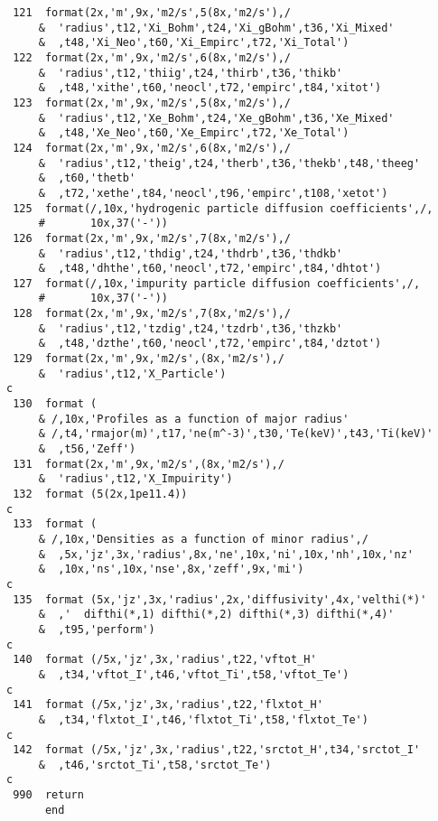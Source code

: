 \begin{verbatim}
 121  format(2x,'m',9x,'m2/s',5(8x,'m2/s'),/
     &  'radius',t12,'Xi_Bohm',t24,'Xi_gBohm',t36,'Xi_Mixed'
     &  ,t48,'Xi_Neo',t60,'Xi_Empirc',t72,'Xi_Total')
 122  format(2x,'m',9x,'m2/s',6(8x,'m2/s'),/
     &  'radius',t12,'thiig',t24,'thirb',t36,'thikb'
     &  ,t48,'xithe',t60,'neocl',t72,'empirc',t84,'xitot')
 123  format(2x,'m',9x,'m2/s',5(8x,'m2/s'),/
     &  'radius',t12,'Xe_Bohm',t24,'Xe_gBohm',t36,'Xe_Mixed'
     &  ,t48,'Xe_Neo',t60,'Xe_Empirc',t72,'Xe_Total')
 124  format(2x,'m',9x,'m2/s',6(8x,'m2/s'),/
     &  'radius',t12,'theig',t24,'therb',t36,'thekb',t48,'theeg'
     &  ,t60,'thetb'
     &  ,t72,'xethe',t84,'neocl',t96,'empirc',t108,'xetot')
 125  format(/,10x,'hydrogenic particle diffusion coefficients',/,
     #       10x,37('-'))
 126  format(2x,'m',9x,'m2/s',7(8x,'m2/s'),/
     &  'radius',t12,'thdig',t24,'thdrb',t36,'thdkb'
     &  ,t48,'dhthe',t60,'neocl',t72,'empirc',t84,'dhtot')
 127  format(/,10x,'impurity particle diffusion coefficients',/,
     #       10x,37('-'))
 128  format(2x,'m',9x,'m2/s',7(8x,'m2/s'),/
     &  'radius',t12,'tzdig',t24,'tzdrb',t36,'thzkb'
     &  ,t48,'dzthe',t60,'neocl',t72,'empirc',t84,'dztot')
 129  format(2x,'m',9x,'m2/s',(8x,'m2/s'),/
     &  'radius',t12,'X_Particle')
c
 130  format (
     & /,10x,'Profiles as a function of major radius'
     & /,t4,'rmajor(m)',t17,'ne(m^-3)',t30,'Te(keV)',t43,'Ti(keV)'
     &  ,t56,'Zeff')
 131  format(2x,'m',9x,'m2/s',(8x,'m2/s'),/
     &  'radius',t12,'X_Impuirity')
 132  format (5(2x,1pe11.4))
c
 133  format (
     & /,10x,'Densities as a function of minor radius',/
     &  ,5x,'jz',3x,'radius',8x,'ne',10x,'ni',10x,'nh',10x,'nz'
     &  ,10x,'ns',10x,'nse',8x,'zeff',9x,'mi')
c
 135  format (5x,'jz',3x,'radius',2x,'diffusivity',4x,'velthi(*)'
     &  ,'  difthi(*,1) difthi(*,2) difthi(*,3) difthi(*,4)'
     &  ,t95,'perform')
c
 140  format (/5x,'jz',3x,'radius',t22,'vftot_H'
     &  ,t34,'vftot_I',t46,'vftot_Ti',t58,'vftot_Te')
c
 141  format (/5x,'jz',3x,'radius',t22,'flxtot_H'
     &  ,t34,'flxtot_I',t46,'flxtot_Ti',t58,'flxtot_Te')
c
 142  format (/5x,'jz',3x,'radius',t22,'srctot_H',t34,'srctot_I'
     &  ,t46,'srctot_Ti',t58,'srctot_Te')
c
 990  return
      end
\end{verbatim}


